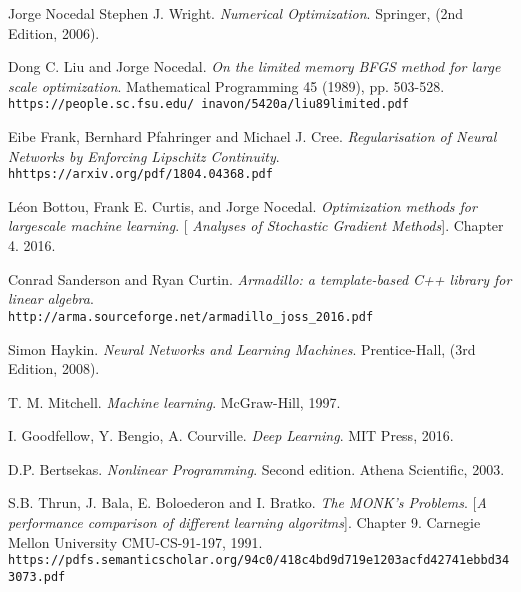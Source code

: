 \begin{thebibliography}{9}

	Jorge Nocedal  Stephen J. Wright.
	\textit{Numerical Optimization}. Springer, (2nd Edition, 2006).

	Dong C. Liu and Jorge Nocedal.
	\textit{On the limited memory BFGS method for large scale optimization}. Mathematical Programming 45 (1989), pp. 503-528.
	\\\texttt{https://people.sc.fsu.edu/~inavon/5420a/liu89limited.pdf}
	
	Eibe Frank, Bernhard Pfahringer and Michael J. Cree. 
	\textit{Regularisation of Neural Networks by Enforcing Lipschitz Continuity}. 
	\\\texttt{hhttps://arxiv.org/pdf/1804.04368.pdf}
	
	Léon Bottou, Frank E. Curtis, and Jorge Nocedal.
	\textit{Optimization methods for largescale machine learning}. 
	[\textit{ Analyses of Stochastic Gradient Methods}]. Chapter 4.
	2016.
	
	Conrad Sanderson and Ryan Curtin. 
	\textit{Armadillo: a template-based C++ library for linear algebra}. 
	\\\texttt{http://arma.sourceforge.net/armadillo\_joss\_2016.pdf}

	
	Simon Haykin. 
	\textit{Neural Networks and Learning Machines}. 
	Prentice-Hall, (3rd Edition, 2008).


	T. M. Mitchell. 
	\textit{Machine learning}. 
	McGraw-Hill, 1997.
	
	I. Goodfellow, Y. Bengio, A. Courville. 
	\textit{Deep Learning}. 
	MIT Press,  2016.
	
	D.P. Bertsekas.
	\textit{Nonlinear Programming}. 
	Second edition. Athena Scientific, 2003.
	
	S.B. Thrun, J. Bala, E. Boloederon and I. Bratko.
	\textit{The MONK's Problems}. 
	[\textit{A performance comparison of different learning algoritms}]. Chapter 9.
	Carnegie Mellon University CMU-CS-91-197, 1991.
	\\\texttt{https://pdfs.semanticscholar.org/94c0/418c4bd9d719e1203acfd42741ebbd343073.pdf}
	
 

	
\end{thebibliography}



